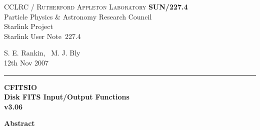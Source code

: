 \documentclass[twoside,11pt]{article}
\newcommand{\stardoccategory}  {Starlink User Note}
\newcommand{\stardocinitials}  {SUN}
\newcommand{\stardocnumber}    {227.4}
\newcommand{\stardocauthors}   {S. E. Rankin, \, M. J. Bly}
\newcommand{\stardocdate}      {12th Nov 2007}
\newcommand{\stardoctitle}     {CFITSIO \\[2ex]
                                Disk FITS Input/Output Functions}
\newcommand{\stardocversion}   {v3.06}
\newcommand{\stardocname}{\stardocinitials /\stardocnumber}
\newenvironment{latexonly}{}{}
\renewcommand{\_}{\texttt{\symbol{95}}}
\begin{document}
\thispagestyle{empty}

\begin{latexonly}
   CCLRC / \textsc{Rutherford Appleton Laboratory} \hfill \textbf{\stardocname}\\
   {\large Particle Physics \& Astronomy Research Council}\\
   {\large Starlink Project\\}
   {\large \stardoccategory\ \stardocnumber}
   \begin{flushright}
   \stardocauthors\\
   \stardocdate
   \end{flushright}
   \vspace{-4mm}
   \rule{\textwidth}{0.5mm}
   \vspace{5mm}
   \begin{center}
   {\Huge\textbf{\stardoctitle \\ [2.5ex]}}
   {\LARGE\textbf{\stardocversion \\ [4ex]}}
   \end{center}
   \vspace{5mm}


   \vspace{10mm}
   \begin{center}
      {\Large\textbf{Abstract}}
   \end{center}
\end{latexonly}
\end{document}
